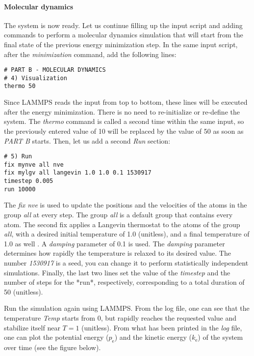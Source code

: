 \paragraph{Molecular dynamics}
The system is now ready. Let us continue filling up the input script and adding commands to perform a molecular dynamics simulation that will start from the final state of the previous energy minimization step. In the same input script, after the \textit{minimization} command, add the following
lines:
\begin{verbatim}
# PART B - MOLECULAR DYNAMICS
# 4) Visualization
thermo 50
\end{verbatim}
Since LAMMPS reads the input from top to bottom, these lines will be executed after the energy minimization. There is no need to re-initialize or re-define the system. The \textit{thermo} command is called a second time within the same input, so the previously entered value of 10 will be replaced by
the value of 50 as soon as \textit{PART B} starts. Then, let us add a second \textit{Run} section:
\begin{verbatim}
# 5) Run
fix mynve all nve
fix mylgv all langevin 1.0 1.0 0.1 1530917
timestep 0.005
run 10000
\end{verbatim}
The \textit{fix nve} is used to update the positions and the velocities of the atoms in the group \textit{all} at every step. The group \textit{all} is a default group that contains every atom. The second fix applies a Langevin thermostat to the atoms of the group \textit{all}, with a desired initial temperature of 1.0 (unitless), and a final temperature of 1.0 as well \cite{schneider1978molecular}. A \textit{damping} parameter of 0.1 is used. The \textit{damping} parameter determines how rapidly the temperature is relaxed to its desired value. The number \textit{1530917} is a seed, you can change it to perform statistically independent simulations. Finally, the last two lines set the value of the \textit{timestep} and the number of steps for the *run*, respectively, corresponding to a total duration of 50 (unitless).

Run the simulation again using LAMMPS. {\color{red}From the log file}, one can see that the temperature \textit{Temp} starts from 0, but rapidly reaches the requested value and stabilize itself near $T=1$ (unitless). \vspace{0.25cm} \noindent From what has been printed in the \textit{log} file, one can plot the potential energy ($p_\text{e}$) and the kinetic energy ($k_\text{e}$) of the system over time {\color{red}(see the figure below)}.

